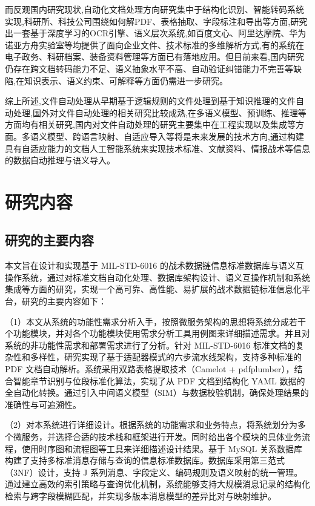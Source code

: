 而反观国内研究现状,自动化文档处理方向研究集中于结构化识别、智能转码系统实现,科研所、科技公司围绕如何解PDF、表格抽取、字段标注和导出等方面,研究出一套基于深度学习的OCR引擎、语义层次系统,如百度文心、阿里达摩院、华为诺亚方舟实验室等均提供了面向企业文件、技术标准的多维解析方式,有的系统在电子政务、科研档案、装备资料管理等方面已有落地应用。但目前来看,国内研究仍存在跨文档转码能力不足、语义抽象水平不高、自动验证纠错能力不完善等缺陷,在知识表示、语义约束、可解释等方面仍需进一步研究。

综上所述,文件自动处理从早期基于逻辑规则的文件处理到基于知识推理的文件自动处理,国外对文件自动处理的相关研究比较成熟,在多语义模型、预训练、推理等方面均有相关研究,国内对文件自动处理的研究主要集中在工程实现以及集成等方面。多语义模型、跨语言映射、自适应导入等将是未来发展的技术方向,通过构建具有自适应能力的文档人工智能系统来实现技术标准、文献资料、情报战术等信息的数据自动推理与语义导入。



\section{研究内容}

\subsection{研究的主要内容}

本文旨在设计和实现基于 MIL-STD-6016 的战术数据链信息标准数据库与语义互操作系统，通过对标准文档自动化处理、数据库架构设计、语义互操作机制和系统集成等方面的研究，实现一个高可靠、高性能、易扩展的战术数据链标准信息化平台，研究的主要内容如下：

（1）本文从系统的功能性需求分析入手，按照微服务架构的思想将系统分成若干个功能模块，并对各个功能模块使用需求分析工具用例图来详细描述需求。并且对系统的非功能性需求和部署需求进行了分析。针对 MIL-STD-6016 标准文档的复杂性和多样性，研究实现了基于适配器模式的六步流水线架构，支持多种标准的 PDF 文档自动解析\cite{MIL_STD_6016_Active_2024,MITRE_Link16_Interoperability_2024}。系统采用双路表格提取技术（Camelot + pdfplumber），结合智能章节识别与位段标准化算法，实现了从 PDF 文档到结构化 YAML 数据的全自动化转换。通过引入中间语义模型（SIM）与数据校验机制，确保处理结果的准确性与可追溯性。

（2）对本系统进行详细设计。根据系统的功能需求和业务特点，将系统划分为多个微服务，并选择合适的技术栈和框架进行开发。同时给出各个模块的具体业务流程，使用时序图和流程图等工具来详细描述设计结果。基于 MySQL 关系数据库构建了支持多标准消息存储与查询的信息标准数据库\cite{Laigner2021Data,Waseem2021Design}。数据库采用第三范式（3NF）设计，支持 J 系列消息、字段定义、编码规则及语义映射的统一管理。通过建立高效的索引策略与查询优化机制，系统能够支持大规模消息记录的结构化检索与跨字段模糊匹配，并实现多版本消息模型的差异比对与映射维护。


